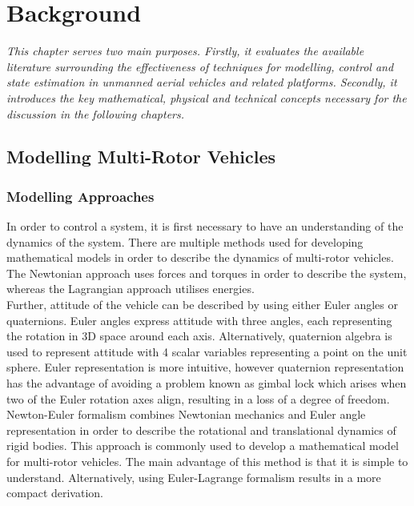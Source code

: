 
\chapter{Background}
\textit{This chapter serves two main purposes. Firstly, it evaluates the available literature surrounding the effectiveness of techniques for modelling, control and state estimation in unmanned aerial vehicles and related platforms. Secondly, it introduces the key mathematical, physical and technical concepts necessary for the discussion in the following chapters.}

\section{Modelling Multi-Rotor Vehicles}
\subsection{Modelling Approaches}
In order to control a system, it is first necessary to have an understanding of the dynamics of the system. There are multiple methods used for developing mathematical models in order to describe the dynamics of multi-rotor vehicles. The Newtonian approach uses forces and torques in order to describe the system, whereas the Lagrangian approach utilises energies\cite{Raine2017}.\\

 Further, attitude of the vehicle can be described by using either Euler angles or quaternions. Euler angles express attitude with three angles, each representing the rotation in 3D space around each axis. Alternatively, quaternion algebra is used to represent attitude with 4 scalar variables representing a point on the unit sphere\cite{Voight2021}. Euler representation is more intuitive, however quaternion representation has the advantage of avoiding a problem known as gimbal lock which arises when two of the Euler rotation axes align, resulting in a loss of a degree of freedom.\\

Newton-Euler formalism combines Newtonian mechanics and Euler angle representation in order to describe the rotational and translational dynamics of rigid bodies. This approach is commonly used to develop a mathematical model for multi-rotor vehicles. The main advantage of this method is that it is simple to understand. Alternatively, using Euler-Lagrange formalism results in a more compact derivation\cite{Zhang2014}. \\

